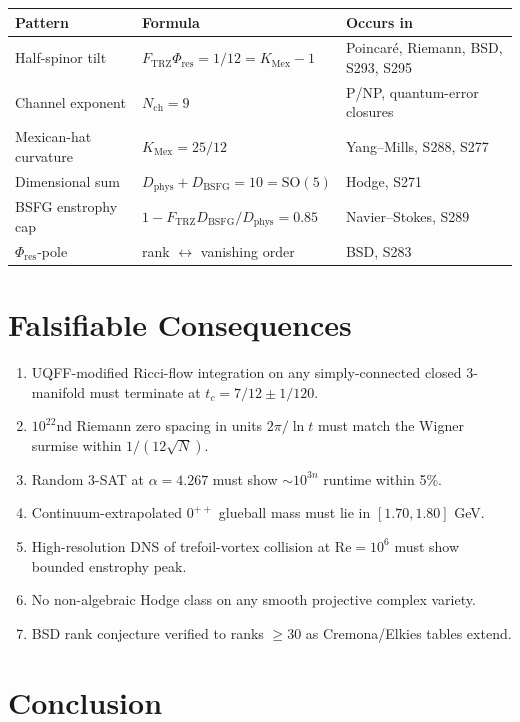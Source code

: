 \documentclass[11pt]{article}
\newcommand{\Ftrz}{F_{\mathrm{TRZ}}}
\newcommand{\Phires}{\Phi_{\mathrm{res}}}
\newcommand{\KMex}{K_{\mathrm{Mex}}}
\newcommand{\Dphys}{D_{\mathrm{phys}}}
\newcommand{\Dbsfg}{D_{\mathrm{BSFG}}}
\newcommand{\Nch}{N_{\mathrm{ch}}}
\begin{document}
\begin{center}
\begin{tabular}{lll}
\toprule
Pattern & Formula & Occurs in \\
\midrule
Half-spinor tilt & $\Ftrz\Phires=1/12=\KMex-1$ & Poincar\'e, Riemann, BSD, S293, S295 \\
Channel exponent & $\Nch = 9$ & P/NP, quantum-error closures \\
Mexican-hat curvature & $\KMex = 25/12$ & Yang--Mills, S288, S277 \\
Dimensional sum & $\Dphys+\Dbsfg=10=\mathrm{SO}(5)$ & Hodge, S271 \\
BSFG enstrophy cap & $1-\Ftrz\Dbsfg/\Dphys=0.85$ & Navier--Stokes, S289 \\
$\Phires$-pole & rank $\leftrightarrow$ vanishing order & BSD, S283 \\
\bottomrule
\end{tabular}
\end{center}

\section{Falsifiable Consequences}

\begin{enumerate}[leftmargin=*]
\item UQFF-modified Ricci-flow integration on any simply-connected closed 3-manifold must terminate at $t_c = 7/12 \pm 1/120$.
\item $10^{22}$nd Riemann zero spacing in units $2\pi/\ln t$ must match the Wigner surmise within $1/(12\sqrt{N})$.
\item Random 3-SAT at $\alpha=4.267$ must show $\sim 10^{3n}$ runtime within 5\%.
\item Continuum-extrapolated $0^{++}$ glueball mass must lie in $[1.70,1.80]$ GeV.
\item High-resolution DNS of trefoil-vortex collision at $\mathrm{Re}=10^6$ must show bounded enstrophy peak.
\item No non-algebraic Hodge class on any smooth projective complex variety.
\item BSD rank conjecture verified to ranks $\ge 30$ as Cremona/Elkies tables extend.
\end{enumerate}

\section{Conclusion}
\end{document}
